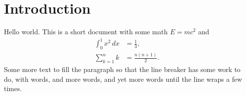 \documentclass{article}
\begin{document}
\section{Introduction}
Hello world. This is a short document with some math $E = mc^2$ and
\begin{align}
  \int_0^1 x^2\,dx &= \frac{1}{3}, \\
  \sum_{k=1}^n k &= \frac{n(n+1)}{2}.
\end{align}
Some more text to fill the paragraph so that the line breaker has some work to do,
with words, and more words, and yet more words until the line wraps a few times.
\end{document}

